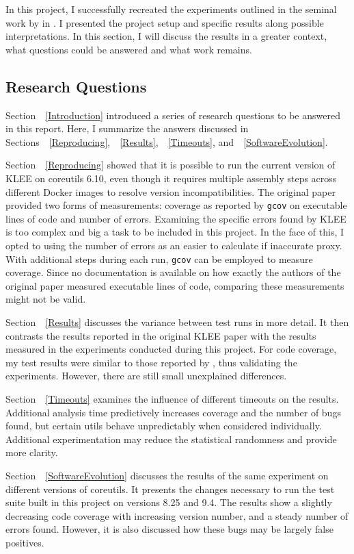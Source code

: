 \documentclass{article}
\let\savedRef=\ref
\renewcommand{\ref}{\unskip~\savedRef}
\begin{document}
In this project, I successfully recreated the experiments outlined in the seminal work by \citeauthor{KLEE} in . I presented the project setup and specific results along possible interpretations. In this section, I will discuss the results in a greater context, what questions could be answered and what work remains.

\subsection{Research Questions}

Section~\ref{Introduction} introduced a series of research questions to be answered in this report. Here, I summarize the answers discussed in Sections~\ref{Reproducing},~\ref{Results},~\ref{Timeouts}, and~\ref{SoftwareEvolution}.

Section~\ref{Reproducing} showed that it is possible to run the current version of KLEE on coreutils 6.10, even though it requires multiple assembly steps across different Docker images to resolve version incompatibilities. The original paper provided two forms of measurements: coverage as reported by \lstinline{gcov} on executable lines of code and number of errors. Examining the specific errors found by KLEE is too complex and big a task to be included in this project. In the face of this, I opted to using the number of errors as an easier to calculate if inaccurate proxy. With additional steps during each run, \lstinline{gcov} can be employed to measure coverage. Since no documentation is available on how exactly the authors of the original paper measured executable lines of code, comparing these measurements might not be valid.

Section~\ref{Results} discusses the variance between test runs in more detail. It then contrasts the results reported in the original KLEE paper with the results measured in the experiments conducted during this project. For code coverage, my test results were similar to those reported by \citeauthor{KLEE}, thus validating the experiments. However, there are still small unexplained differences.

Section~\ref{Timeouts} examines the influence of different timeouts on the results. Additional analysis time predictively increases coverage and the number of bugs found, but certain utils behave unpredictably when considered individually. Additional experimentation may reduce the statistical randomness and provide more clarity.

Section~\ref{SoftwareEvolution} discusses the results of the same experiment on different versions of coreutils. It presents the changes necessary to run the test suite built in this project on versions 8.25 and 9.4. The results show a slightly decreasing code coverage with increasing version number, and a steady number of errors found. However, it is also discussed how these bugs may be largely false positives.
\end{document}
